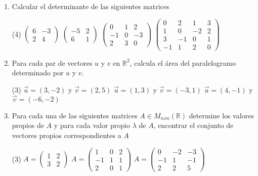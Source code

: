 \documentclass[letterpaper,11pt]{article}
\begin{document}
\begin{enumerate}
\item Calcular el determinante de las siguientes matrices 
\begin{tasks}(4)
\task $\begin{pmatrix} 6 & -3 \\ 2 & 4 \end{pmatrix}$
\task $\begin{pmatrix} -5 & 2 \\ 6 & 1 \end{pmatrix}$ 
\task $\begin{pmatrix} 0 & 1 & 2 \\ -1 & 0 & -3 \\ 2 & 3 & 0 \end{pmatrix}$ 
\task $\begin{pmatrix} 0 & 2 & 1 & 3 \\ 1 & 0 & -2 & 2 \\ 3 & -1 & 0 & 1 \\ -1 & 1 & 2 & 0 \end{pmatrix}$ 
\end{tasks}
\item Para cada par de vectores $u$ y $v$ en $\mathbb{R}^2$, calcula el área del paralelogramo determinado por $u$ y $v$.

\begin{tasks}(3)
\task $\vec{u} = (3,-2)$ y $\vec{v} = (2,5)$
\task $\vec{u}  = (1,3)$ y $\vec{v}  = (-3,1)$ 
\task $\vec{u}  = (4,-1)$ y $\vec{v}  = (-6,-2)$
\end{tasks}
\item Para cada una de las siguientes matrices $A \in M_{nxn}(\mathbb{R})$ determine los valores propios de $A$ y para cada valor propio $\lambda$ de $A$, encontrar el conjunto de vectores propios correspondientes a $A$

\begin{tasks}(3)
\task $A = \begin{pmatrix} 1 & 2 \\ 3 & 2 \end{pmatrix}$
\task $A = \begin{pmatrix} 1 & 0 & 2 \\ -1 & 1 & 1 \\ 2 & 0 & 1 \end{pmatrix}$
\task $A = \begin{pmatrix} 0 & -2 & -3 \\ -1 & 1 & -1 \\ 2 & 2 & 5 \end{pmatrix}$
\end{tasks}


\end{enumerate}
\end{document}
